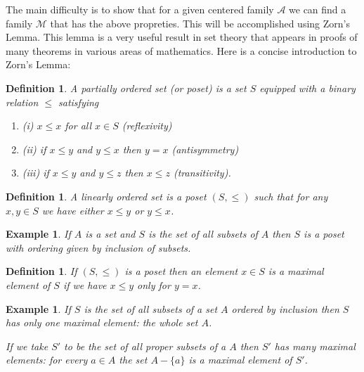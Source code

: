 \documentclass[11pt, letterpaper, oneside]{report}
\theoremstyle{pplain}
\newtheorem{ITERMVALUE THM}[theorem]{Intermediate Value Theorem}
\newtheorem{HEINEBOREL THM}[theorem]{Heine-Borel Theorem}
\newtheorem{UMETR THM}[theorem]{Urysohn Metrization Theorem}
\newtheorem{UMETR2 THM}[theorem]{Urysohn Metrization Theorem (v.2)}
\theoremstyle{ddefinition}
\newtheorem{definition}[theorem]{Definition}
\newtheorem{example}[theorem]{Example}
\theoremstyle{nnn}
\newtheorem{TDA NN}[theorem]{Topological Data Analysis. }
\theoremstyle{eexercise}
\renewcommand{\AA}{{\mathcal A}}
\newcommand{\MM}{{\mathcal M}}
\newcommand{\benu}{\begin{enumerate}}
\newcommand{\eenu}{\end{enumerate}}
\begin{document}
The main difficulty is to show that for a given centered family $\AA$  we can find 
a family $\MM$ that has the above propreties. This will be accomplished 
using  Zorn's Lemma.  This lemma is a very useful result in set theory that appears  
in proofs of many theorems in various areas of mathematics.  Here is a  concise introduction 
to  Zorn's Lemma:

\begin{definition}
\label{PARTIAL ORDER DEF}
A \emph{partially ordered set} (or \emph{poset}) is a set $S$ equipped with a binary relation $\leq$
satisfying 
\benu
\item[(i)] $x\leq x$ for all $x\in S$ (reflexivity)
\item[(ii)] if $x\leq y$ and $y\leq x$ then $y = x$ (antisymmetry)
\item[(iii)] if $x\leq y$ and $y\leq z$ then $x\leq z$ (transitivity).

\eenu

\end{definition}

\begin{definition}
\label{LINEAR ORDER DEF}
A \emph{linearly ordered set} is a poset $(S, \leq)$ such that for any $x, y\in S$ we have 
either $x\leq y$ or $y\leq x$.
\end{definition}

\begin{example}
If $A$ is a set and $S$ is the set of all subsets of $A$ then $S$ is a poset with ordering 
given by inclusion of subsets. 
\end{example}


\begin{definition}
If $(S, \leq)$ is a poset then an element $x\in S$ is a \emph{maximal element} of $S$
if  we have $x\leq y$ only for $y= x$.
\end{definition}


\begin{example}
If $S$ is the set of all subsets of a set $A$ ordered by  inclusion then 
$S$ has only one maximal element: the whole set $A$. 

If we take  $S'$ to be the set of all \emph{proper} subsets of a $A$ then $S'$ has many
maximal elements: for every $a\in A$ the set $A-\{a\}$ is a maximal element of $S'$.
\end{example}
\end{document}
